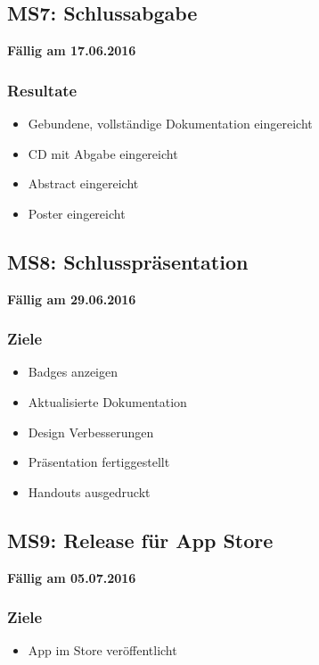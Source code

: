 \subsection{MS7: Schlussabgabe}
\label{pm-ms7}

\textbf{Fällig am 17.06.2016}

\subsubsection{Resultate}

\begin{itemize}
	\item Gebundene, vollständige Dokumentation eingereicht
	\item CD mit Abgabe eingereicht
	\item Abstract eingereicht
	\item Poster eingereicht
\end{itemize}


\subsection{MS8: Schlusspräsentation}
\label{pm-ms8}

\textbf{Fällig am 29.06.2016}

\subsubsection{Ziele}

\begin{itemize}
	\item Badges anzeigen
	\item Aktualisierte Dokumentation
	\item Design Verbesserungen
	\item Präsentation fertiggestellt
	\item Handouts ausgedruckt
\end{itemize}

\subsection{MS9: Release für App Store}
\label{pm-ms9}

\textbf{Fällig am 05.07.2016}

\subsubsection{Ziele}

\begin{itemize}
	\item {} App im  Store veröffentlicht
\end{itemize}
